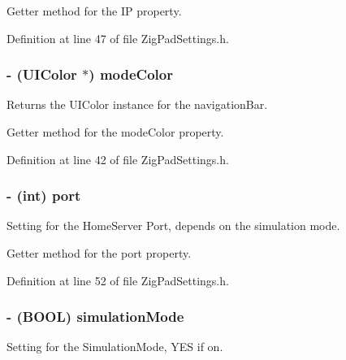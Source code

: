 Getter method for the IP property. 

Definition at line 47 of file ZigPadSettings.h.

\hypertarget{interface_zig_pad_settings_a22b7a43d44d562d77d8534e46db89fe1}{
\subsubsection[{modeColor}]{\setlength{\rightskip}{0pt plus 5cm}-\/ (UIColor $\ast$) modeColor}}
\label{interface_zig_pad_settings_a22b7a43d44d562d77d8534e46db89fe1}
Returns the UIColor instance for the navigationBar.

Getter method for the modeColor property. 

Definition at line 42 of file ZigPadSettings.h.

\hypertarget{interface_zig_pad_settings_a63c89c04d1feae07ca35558055155ffb}{
\subsubsection[{port}]{\setlength{\rightskip}{0pt plus 5cm}-\/ (int) port}}
\label{interface_zig_pad_settings_a63c89c04d1feae07ca35558055155ffb}
Setting for the HomeServer Port, depends on the simulation mode.

Getter method for the port property. 

Definition at line 52 of file ZigPadSettings.h.

\hypertarget{interface_zig_pad_settings_ab314ed8d97474bb5391236ced665bd3b}{
\subsubsection[{simulationMode}]{\setlength{\rightskip}{0pt plus 5cm}-\/ (BOOL) simulationMode}}
\label{interface_zig_pad_settings_ab314ed8d97474bb5391236ced665bd3b}
Setting for the SimulationMode, YES if on.

